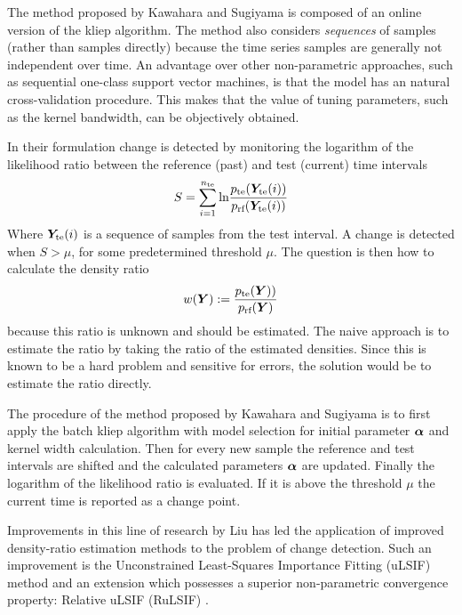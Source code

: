 The method proposed by Kawahara and Sugiyama \cite{kawahara2009change} is composed of an online version of the \gls{kliep} algorithm.
The method also considers \emph{sequences} of samples (rather than samples directly) because the time series samples are generally not independent over time.
An advantage over other non-parametric approaches, such as sequential one-class support vector machines, is that the model has an natural cross-validation procedure.
This makes that the value of tuning parameters, such as the kernel bandwidth, can be objectively obtained.

In their formulation change is detected by monitoring the logarithm of the likelihood ratio between the reference (past) and test (current) time intervals
\begin{equation}
  S = \sum_{i=1}^{n_\text{te}} \text{ln} \frac{p_{\text{te}}(\matrixsym{Y}_\text{te}(i))}{p_\text{rf}(\matrixsym{Y}_\text{te}(i))}
\end{equation}
Where $\matrixsym{Y}_\text{te}(i)$ is a sequence of samples from the test interval.
A change is detected when $S > \mu$, for some predetermined threshold $\mu$.
The question is then how to calculate the density ratio
\begin{equation}
  w(\matrixsym{Y}) := \frac{p_\text{te}(\matrixsym{Y)})}{p_\text{rf}(\matrixsym{Y})}
\end{equation}
because this ratio is unknown and should be estimated.
The naive approach is to estimate the ratio by taking the ratio of the estimated densities.
Since this is known to be a hard problem and sensitive for errors, the solution would be to estimate the ratio directly.

The procedure of the method proposed by Kawahara and Sugiyama \cite{kawahara2009change} is to first apply the batch \gls{kliep} algorithm with model selection for initial parameter $\vectorsym{\alpha}$ and kernel width calculation.
Then for every new sample the reference and test intervals are shifted and the calculated parameters $\vectorsym{\alpha}$ are updated.
Finally the logarithm of the likelihood ratio is evaluated.
If it is above the threshold $\mu$ the current time is reported as a change point.

Improvements in this line of research by Liu \etal \cite{liu2013change} has led the application of improved density-ratio estimation methods to the problem of change detection.
Such an improvement is the Unconstrained Least-Squares Importance Fitting (uLSIF) method \cite{kanamori2009least} and an extension which possesses a superior non-parametric convergence property: Relative uLSIF (RuLSIF) \cite{yamada2013relative}.